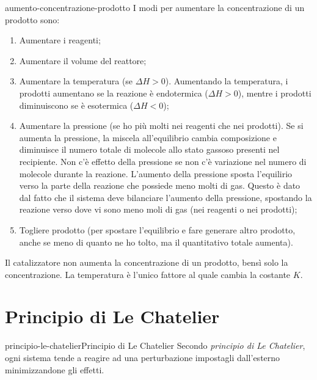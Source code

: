 \documentclass[preview]{standalone}
\begin{document}
\begin{snippet}{aumento-concentrazione-prodotto}
    I modi per aumentare la concentrazione di un prodotto sono:
\begin{enumerate}
    \item Aumentare i reagenti;
    \item Aumentare il volume del reattore;
    \item Aumentare la temperatura (se \(\Delta H > 0\)).
        Aumentando la temperatura,
        i prodotti aumentano se la reazione è endotermica (\(\Delta H > 0\)),
        mentre i prodotti diminuiscono se è esotermica (\(\Delta H < 0\));
    \item Aumentare la pressione (se ho più molti nei reagenti che nei prodotti).
        Se si aumenta la pressione, la miscela all'equilibrio
        cambia composizione e diminuisce il numero totale di molecole allo stato gassoso presenti nel recipiente.
        Non c'è effetto della pressione
        se non c'è variazione nel numero di molecole durante la reazione.
        L'aumento della pressione sposta l'equilirio verso la parte della reazione che possiede meno molti di gas.
        Questo è dato dal fatto che il sistema deve bilanciare l'aumento della pressione, spostando
        la reazione verso dove vi sono meno moli di gas (nei reagenti o nei prodotti);
    \item Togliere prodotto (per spostare l'equilibrio e fare generare altro prodotto, anche se meno di quanto ne ho tolto,
        ma il quantitativo totale aumenta).
\end{enumerate}

Il catalizzatore non aumenta la concentrazione di un prodotto, bensì solo la concentrazione.
La temperatura è l'unico fattore al quale cambia la costante \(K\).
\end{snippet}

\section{Principio di Le Chatelier}

\begin{snippetdefinition}{principio-le-chatelier}{Principio di Le Chatelier}
    Secondo \textit{principio di Le Chatelier},
    ogni sistema tende a reagire ad una perturbazione impostagli
    dall'esterno minimizzandone gli effetti.
\end{snippetdefinition}
\end{document}
